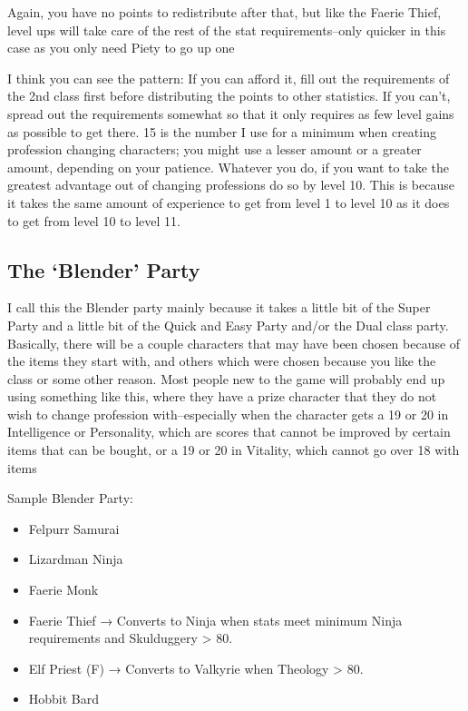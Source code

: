 \documentclass[12pt]{article}
\providecommand{\tightlist}{%
  \setlength{\itemsep}{0pt}\setlength{\parskip}{0pt}}
\begin{document}
Again, you have no points to redistribute after that, but like the
Faerie Thief, level ups will take care of the rest of the stat
requirements--only quicker in this case as you only need Piety to go up
one

I think you can see the pattern: If you can afford it, fill out the
requirements of the 2nd class first before distributing the points to
other statistics. If you can't, spread out the requirements somewhat so
that it only requires as few level gains as possible to get there. 15 is
the number I use for a minimum when creating profession changing
characters; you might use a lesser amount or a greater amount, depending
on your patience. Whatever you do, if you want to take the greatest
advantage out of changing professions do so by level 10. This is because
it takes the same amount of experience to get from level 1 to level 10
as it does to get from level 10 to level 11.

\subsection{\texorpdfstring{The `Blender'
Party}{The Blender Party}}\label{the-blender-party}

I call this the Blender party mainly because it takes a little bit of
the Super Party and a little bit of the Quick and Easy Party and/or the
Dual class party. Basically, there will be a couple characters that may
have been chosen because of the items they start with, and others which
were chosen because you like the class or some other reason. Most people
new to the game will probably end up using something like this, where
they have a prize character that they do not wish to change profession
with--especially when the character gets a 19 or 20 in Intelligence or
Personality, which are scores that cannot be improved by certain items
that can be bought, or a 19 or 20 in Vitality, which cannot go over 18
with items

Sample Blender Party:

\begin{itemize}
\tightlist
\item
  Felpurr Samurai
\item
  Lizardman Ninja
\item
  Faerie Monk
\item
  Faerie Thief → Converts to Ninja when stats meet minimum Ninja
  requirements and Skulduggery \textgreater{} 80.
\item
  Elf Priest (F) → Converts to Valkyrie when Theology \textgreater{} 80.
\item
  Hobbit Bard
\end{itemize}
\end{document}
